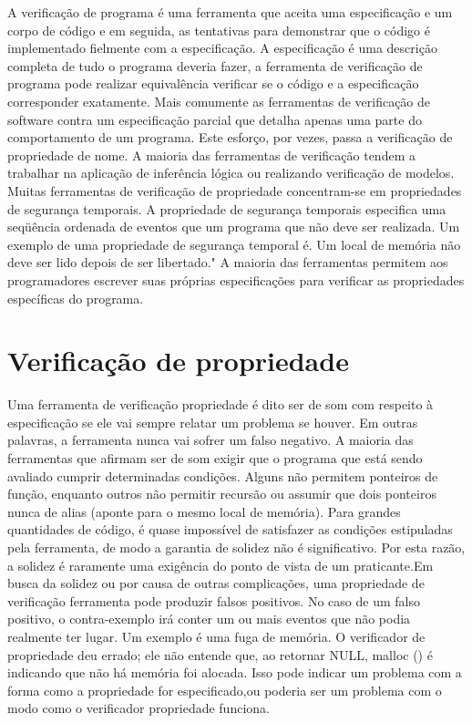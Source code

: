 	A verificação de programa é uma ferramenta que aceita uma especificação e um corpo de código e em seguida, as tentativas para demonstrar que o código é implementado fielmente com a especificação. A especificação é uma descrição completa de tudo o programa deveria fazer, a ferramenta de verificação de programa pode realizar equivalência verificar se o código e a especificação corresponder exatamente. Mais comumente as ferramentas de verificação de software contra um especificação parcial que detalha apenas uma parte do comportamento de um programa. Este esforço, por vezes, passa a verificação de propriedade de nome. A maioria das ferramentas de verificação tendem a trabalhar na aplicação de inferência lógica ou realizando verificação de modelos. Muitas ferramentas de verificação de propriedade concentram-se em propriedades de segurança temporais. A propriedade de segurança temporais especifica uma seqüência ordenada de eventos que um programa que não deve ser realizada. Um exemplo de uma propriedade de segurança temporal é. Um local de memória não deve ser lido depois de ser libertado." A maioria das ferramentas permitem aos programadores escrever suas próprias especificações para verificar as propriedades específicas do programa.\\
	
	\section {Verificação de propriedade}
	
	Uma ferramenta de verificação propriedade é dito ser de som com respeito à especificação se ele vai sempre relatar um problema se houver. Em outras palavras, a ferramenta nunca vai sofrer um falso negativo. A maioria das ferramentas que afirmam ser de som exigir que o programa que está sendo avaliado cumprir determinadas condições. Alguns não permitem ponteiros de função, enquanto outros não permitir recursão ou assumir que dois ponteiros nunca de alias (aponte para o mesmo local de memória). Para grandes quantidades de código, é quase impossível de satisfazer as condições estipuladas pela ferramenta, de modo a garantia de solidez não é significativo. Por esta razão, a solidez é raramente uma exigência do ponto de vista de um praticante.Em busca da solidez ou por causa de outras complicações, uma propriedade de verificação ferramenta pode produzir falsos positivos. No caso de um falso positivo, o contra-exemplo irá conter um ou mais eventos que não podia realmente ter lugar. Um exemplo é uma fuga de memória. O verificador de propriedade deu errado; ele não entende que, ao retornar NULL, malloc () é indicando que não há memória foi alocada. Isso pode indicar um problema com a forma como a propriedade for especificado,ou poderia ser um problema com o modo como o verificador propriedade funciona.